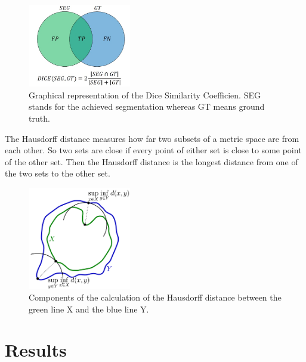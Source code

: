 \documentclass[journal]{IEEEtran}
\begin{document}
	\begin{figure}[h]
		\centering
		\includegraphics[width=0.4\textwidth]{diceGraphics.png}
		\caption{Graphical representation of the Dice Similarity Coefficien. SEG stands for the achieved segmentation whereas GT means ground truth.}
		\label{fig:e8}
	\end{figure}

	The Hausdorff distance measures how far two subsets of a metric space are from each other. So two sets are close if every point of either set is close 
	to some point of the other set. Then the Hausdorff distance is the longest distance from one of the two sets to the other set.
	\begin{figure}[h]
		\centering
		\includegraphics[width=0.4\textwidth]{haussdorfGraphics.png}
		\caption{Components of the calculation of the Hausdorff distance between the green line X and the blue line Y.}
		\label{fig:e8}
	\end{figure}



\section{Results}
\end{document}
